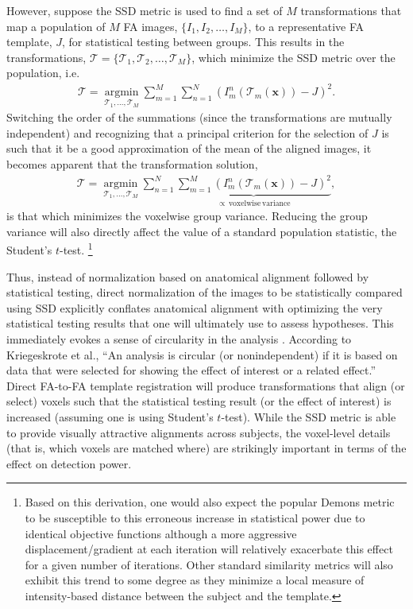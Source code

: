 \documentclass[final,5p,times,twocolumn]{elsarticle}
\begin{document}
However, suppose the SSD metric is used to find a set of $M$ transformations that map a population of $M$ FA images, $\{I_1, I_2, \ldots, I_M\}$, to a representative FA template, $J$, for statistical testing between groups. This results in the transformations,
$\boldsymbol{\mathcal{T}} = \{\mathcal{T}_1, \mathcal{T}_2,\ldots,\mathcal{T}_M \}$, which minimize the SSD metric over the population, i.e.
\begin{align}
  \boldsymbol{\mathcal{T}} = \underset{\mathcal{T}_1, \ldots, \mathcal{T}_M}{\operatorname{argmin}}
    \sum_{m=1}^M\sum_{n=1}^N \left( I^n_m( \mathcal{T}_m(\mathbf{x}) ) - J \right)^2.
\end{align}
Switching the order of the summations (since the transformations are mutually independent) and recognizing that a principal criterion for the selection of $J$ is such that it be a good approximation of the mean of the aligned images, it becomes apparent that the transformation solution,
\begin{align}\label{eq:variance}
  \boldsymbol{\mathcal{T}} = \underset{\mathcal{T}_1, \ldots, \mathcal{T}_M}{\operatorname{argmin}}
    \sum_{n=1}^N \underbrace{\sum_{m=1}^M \left( I^n_m( \mathcal{T}_m(\mathbf{x}) ) - J \right)^2}_{
    \propto\mathrm{\,voxelwise\,variance}},
\end{align}
is that which minimizes the voxelwise group variance.  Reducing the group variance will also directly affect the value of a standard population statistic, the Student's $t$-test.%
\footnote{
Based on this derivation, one would also expect the popular Demons metric to be susceptible to this erroneous increase in statistical power due to identical objective functions although a more aggressive displacement/gradient at each iteration will relatively exacerbate this effect for a given number of iterations.  
Other standard similarity metrics will also exhibit this
trend to some degree as they minimize a local measure of intensity-based distance between the subject and the template.
}  

Thus, instead of normalization based on anatomical alignment followed by
statistical testing, direct normalization of the images to be statistically compared using SSD
explicitly conflates
anatomical alignment with optimizing the very statistical testing
results that one will ultimately use to assess hypotheses.  This immediately evokes a sense of circularity in the analysis \citep{Kriegeskorte2010}.
According to Kriegeskrote et al., ``An analysis is circular (or nonindependent) if it is based on data that were selected for showing the effect of interest or a related effect.''  Direct FA-to-FA template registration will produce transformations that align (or select) voxels such that the statistical testing result (or the effect of interest) is increased (assuming one is using Student's 
$t$-test).  While the SSD metric is able to provide visually attractive alignments across subjects, the voxel-level details (that is, which voxels are matched where) are strikingly important in terms of the effect on detection power.  
\end{document}
